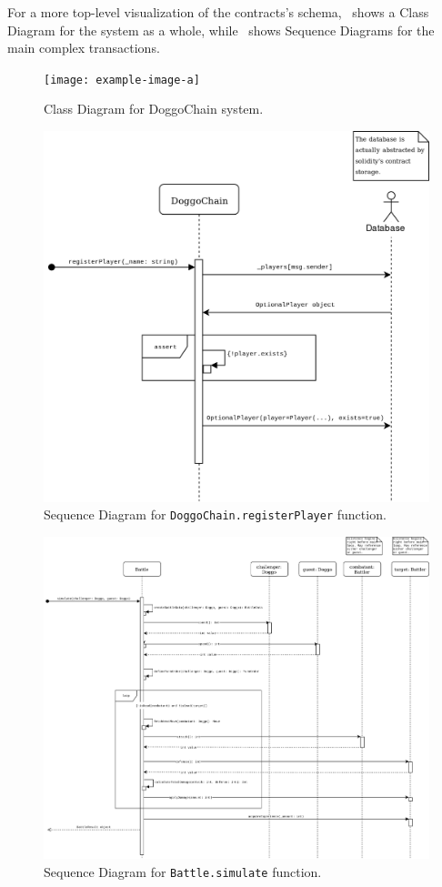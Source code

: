 \documentclass{article}
\begin{document}
    For a more top-level visualization of the contracts's
    schema,~ shows a Class Diagram for the system as a
    whole, while~ shows Sequence
    Diagrams for the main complex transactions.

    \begin{figure}[h]
        \centering{}
        \texttt{[image: example-image-a]}
        \caption{Class Diagram for DoggoChain system.~\label{fig:class-diagram}}
    \end{figure}

    \begin{figure}[h]
        \centering{}
        \includegraphics[width=1\textwidth]{img/DoggoChain - registerPlayer SD}
        \caption{%
            Sequence Diagram for \texttt{DoggoChain.registerPlayer}
            function.~\label{fig:registerPlayerSD}
        }
    \end{figure}

    \begin{figure}[h]
        \centering{}
        \includegraphics[width=1\textwidth]{img/DoggoChain - simulate SD}
        \caption{%
            Sequence Diagram for \texttt{Battle.simulate}
            function.~\label{fig:simulateSD}
        }
    \end{figure}
\end{document}
